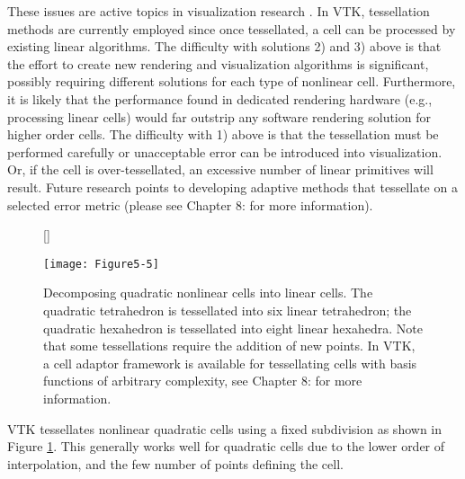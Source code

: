 These issues are active topics in visualization research \cite{Schroeder05}. In VTK, tessellation methods are currently employed since once tessellated, a cell can be processed by existing linear algorithms. The difficulty with solutions 2) and 3) above is that the effort to create new rendering and visualization algorithms is significant, possibly requiring different solutions for each type of nonlinear cell. Furthermore, it is likely that the performance found in dedicated rendering hardware (e.g., processing linear cells) would far outstrip any software rendering solution for higher order cells. The difficulty with 1) above is that the tessellation must be performed carefully or unacceptable error can be introduced into visualization. Or, if the cell is over-tessellated, an excessive number of linear primitives will result. Future research points to developing adaptive methods that tessellate on a selected error metric (please see Chapter 8:  for more information).

\begin{figure}[!htb]
	[\FBwidth]
	{\caption{Decomposing quadratic nonlinear cells into linear cells. The quadratic tetrahedron is tessellated into six linear tetrahedron; the quadratic hexahedron is tessellated into eight linear hexahedra. Note that some tessellations require the addition of new points. In VTK, a cell adaptor framework is available for tessellating cells with basis functions of arbitrary complexity, see Chapter 8:  for more information.}\label{fig:Figure5-5}}
	{\texttt{[image: Figure5-5]}}
\end{figure}

VTK tessellates nonlinear quadratic cells using a fixed subdivision as shown in Figure \ref{fig:Figure5-5}. This generally works well for quadratic cells due to the lower order of interpolation, and the few number of points defining the cell.

